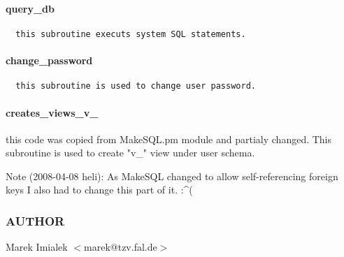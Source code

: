 \paragraph*{query\_db\label{Apiis::Auth::AccessControl_--_used_by_the_runall_pl_and_access_control_pl_scripts_to_define_user_access_rights_query_db}}
\begin{verbatim}
  this subroutine executs system SQL statements.
\end{verbatim}
\paragraph*{change\_password\label{Apiis::Auth::AccessControl_--_used_by_the_runall_pl_and_access_control_pl_scripts_to_define_user_access_rights_change_password}}
\begin{verbatim}
  this subroutine is used to change user password.
\end{verbatim}
\paragraph*{creates\_views\_v\_\label{Apiis::Auth::AccessControl_--_used_by_the_runall_pl_and_access_control_pl_scripts_to_define_user_access_rights_creates_views_v_}}


this code was copied from MakeSQL.pm module and partialy changed.  This
subroutine is used to create "v\_" view under user schema.



Note (2008-04-08 heli):
As MakeSQL changed to allow self-referencing foreign keys I also had to change
this part of it. :\^{}(

\subsubsection*{AUTHOR\label{Apiis::Auth::AccessControl_--_used_by_the_runall_pl_and_access_control_pl_scripts_to_define_user_access_rights_AUTHOR}}


Marek Imialek $<$marek@tzv.fal.de$>$

